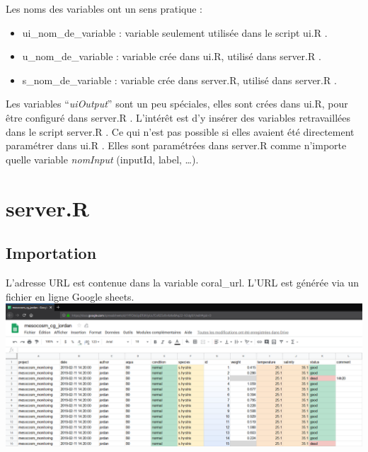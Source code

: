 \documentclass[]{book}
\providecommand{\tightlist}{%
  \setlength{\itemsep}{0pt}\setlength{\parskip}{0pt}}
\begin{document}
Les noms des variables ont un sens pratique :

\begin{itemize}
\tightlist
\item
  ui\_nom\_de\_variable : variable seulement utilisée dans le script
  ui.R .
\item
  u\_nom\_de\_variable : variable crée dans ui.R, utilisé dans server.R
  .
\item
  s\_nom\_de\_variable : variable crée dans server.R, utilisé dans
  server.R .
\end{itemize}

Les variables ``\emph{uiOutput}'' sont un peu spéciales, elles sont
crées dans ui.R, pour être configuré dans server.R . L'intérêt est d'y
insérer des variables retravaillées dans le script server.R . Ce qui
n'est pas possible si elles avaient été directement paramétrer dans ui.R
. Elles sont paramétrées dans server.R comme n'importe quelle variable
\emph{nomInput} (inputId, label, \ldots{}).

\section{server.R}\label{server.r}

\subsection{Importation}\label{importation}

L'adresse URL est contenue dans la variable coral\_url. L'URL est
générée via un fichier en ligne Google sheets.
\includegraphics{image/notebook-googlesheets0.png}
\end{document}
